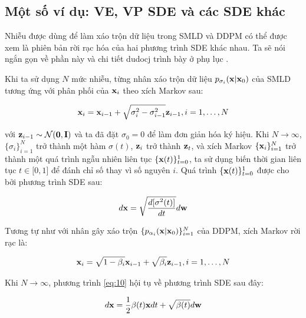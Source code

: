 \documentclass{article} %
\begin{document}
\subsection{Một số ví dụ: VE, VP SDE và các SDE khác}

Nhiễu được dùng để làm xáo trộn dữ liệu trong SMLD và DDPM có thể được xem là phiên bản rời rạc hóa của hai phương trình SDE khác nhau.
Ta sẽ nói ngắn gọn về phần này và chi tiết dudocj trình bày ở phụ lục .

Khi ta sử dụng $N$ mức nhiễu, từng nhân xáo trộn dữ liệu $p_{\sigma_i}(\bold{x} \vert \bold{x}_0)$ của SMLD tương ứng với phân phối của $\bold{x}_i$ theo xích Markov sau:

\begin{equation}
    \bold{x}_i = \bold{x}_{i-1} + \sqrt{\sigma_i^2 - \sigma_{i-1}^2} \bold{z}_{i-1}, i=1, \dots, N
\end{equation}

với $\bold{z}_{i-1} \sim \mathcal{N}(\bold{0}, \bold{I})$ và ta đã đặt $\sigma_0=0$ để làm đơn giản hóa ký hiệu.
Khi $N \rightarrow \infty$, $\lbrace \sigma_i \rbrace_{i=1}^N$ trở thành một hàm $\sigma(t)$, $\bold{z}_i$ trở thành $\bold{z}_t$, và xích Markov $\lbrace \bold{x}_i \rbrace_{i=1}^N$ trở thành một quá trình ngẫu nhiên liên tục $\lbrace \bold{x}(t) \rbrace_{t=0}^1$, ta sử dụng biến thời gian liên tục $t \in \lbrack 0, 1 \rbrack$ để đánh chỉ số thay vì số nguyên $i$.
Quá trình $\lbrace \bold{x}(t) \rbrace_{t=0}^1$ được cho bởi phương trình SDE sau:

\begin{equation} \label{eq:9}
    d \bold{x} = \sqrt{\dfrac{d \lbrack \sigma^2(t) \rbrack}{dt}} d \bold{w}
\end{equation}

Tương tự như với nhân gây xáo trộn $\lbrace p_{\alpha_i} (\bold{x} \vert \bold{x}_0) \rbrace_{i=1}^N$ của DDPM, xích Markov rời rạc là:

\begin{equation} \label{eq:10}
    \bold{x}_i = \sqrt{1 - \beta_i} \bold{x}_{i-1} + \sqrt{\beta_i} \bold{z}_{i-1}, i=1,\dots,N
\end{equation}

Khi $N \rightarrow \infty$, phương trình \ref{eq:10} hội tụ về phương trình SDE sau đây:

\begin{equation} \label{eq:11}
    d \bold{x} = \dfrac{1}{2} \beta(t) \bold{x} dt + \sqrt{\beta(t)} d\bold{w}
\end{equation}
\end{document}
